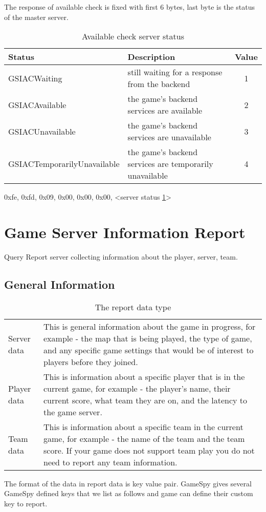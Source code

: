 \documentclass[oneside,titlepage,a4paper]{Definition/retrospy} %
\begin{document}
The response of available check is fixed with first 6 bytes, last byte is the status of the master server.

\begin{table}[H]
	\centering
	\begin{tabular}{|l|m{5cm}|c|}
		\hline
		\textbf{Status}&\textbf{Description}&\textbf{Value}\\\hline
		GSIACWaiting&still waiting for a response from the backend&1\\\hline
		GSIACAvailable&the game's backend services are available&2\\\hline
		GSIACUnavailable& the game's backend services are unavailable&3\\\hline
		GSIACTemporarilyUnavailable&the game's backend services are temporarily unavailable&4\\\hline
	\end{tabular}
\caption{Available check server status}
\label{Available check server status}
\end{table}

\ServerResponse

\begin{mybox}
	0xfe, 0xfd, 0x09, 0x00, 0x00, 0x00, <server status \ref{Available check server status}>
\end{mybox}

\chapter{Game Server Information Report}
Query Report server collecting information about the player, server, team.
\section{General Information}
\begin{table}[H]
	\centering
	\begin{tabular}{|l|m{9cm}|}
		\hline
		\tbf{Data type}&\tbf{Description}\\\hline
		Server data&This is general information about the game in progress, for example - the map that is being played, the type of game, and any specific game settings that would be of interest to players before they joined.\\\hline
		Player data&This is information about a specific player that is in the current game, for example - the player's name, their current score, what team they are on, and the latency to the game server. 
		\\\hline
		Team data&This is information about a specific team in the current game, for example - the name of the team and the team score. If your game does not support team play you do not need to report any team information. 
		\\\hline
	\end{tabular}
\caption{The report data type }
\label{The report data type}
\end{table}
The format of the data in report data is key value pair. GameSpy gives several GameSpy defined keys that we list as follows and game can define their custom key to report.
\end{document}
